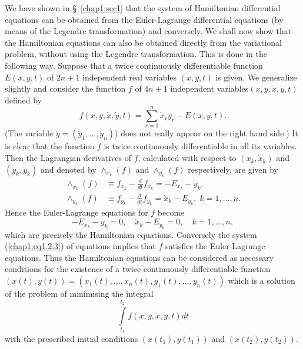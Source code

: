 We have shown in \S\ \ref{chap1:sec1} that the system of Hamiltonian differential equations can be obtained from the Euler-Lagrange differential equations (by means of the Legendre transformation) and conversely. We shall now show that the Hamiltonian equations can also be obtained directly from the variational problem, without using the Legendre transformation. This is done in the following way. Suppose that a twice continuously differentiable function $E(x,y, t)$ of $2n+1$ independent real variables $(x,y,t)$ is given. We generalize slightly and consider the function $f$ of $4n+1$ independent variables\pageoriginale $(x, y, \dot{x}, \dot{y}, t)$ defined by
\begin{equation*} 
f (x, y, \dot{x}, \dot{y}, t) = \sum\limits^n_{r=1} \dot{x}_r y_r - E(x,y,t).
\tag{1.2.1}\label{chap1:eq1.2.1}
\end{equation*}
(The variable $\dot{y} = (\dot{y}_1, \ldots, \dot{y}_n)$) does not really appear on the right hand side.) It is clear that the function $f$ is twice continuously differentiable in all its variables. Then the Lagrangian derivatives of $f$, calculated with respect to $(x_k, \dot{x}_k)$ and $(y_k, \dot{y}_k)$ and denoted by $\wedge_{x_k}(f)$ and $\wedge_{y_k} (f)$ respectively, are given by 
\begin{align*}
\wedge_{x_k} (f) & \equiv f_{x_k} - \frac{d}{dt} f_{\dot{x}_k} = - E_{x_k} - \dot{y}_k, \tag{1.2.2}\label{chap1:eq1.2.2}\\
\wedge_{y_k} (f) & \equiv f_{y_k} - \frac{d}{dt} f_{\dot{y}_k} = \dot{x}_k - E_{y_k}, \; k =1 ,\ldots, n.
\end{align*}
Hence the Euler-Lagrange equations for $f$ become
\begin{equation*}
-E_{x_k} - \dot{y}_k = 0, \quad \dot{x}_k - E_{y_k} = 0, \quad k = 1, \ldots, n,
\tag{1.2.3}\label{chap1:eq1.2.3}
\end{equation*}
which are precisely the Hamiltonian equations. Conversely the system (\ref{chap1:eq1.2.3}) of equations implies that $f$ satisfies the Euler-Lagrange equations. Thus the Hamiltonian equations can be considered as necessary conditions for the existence of a twice continuously differentiable function $(x(t), y(t)) = (x_1 (t), \ldots, x_n(t), y_1(t),\ldots , y_n(t))$ which is a solution of the problem of minimising the integral
$$
\int\limits^{t_2}_{t_1} f(x, y, \dot{x}, \dot{y}, t) dt
$$
with the prescribed initial conditions $(x(t_1), y(t_1))$ and $(x(t_2), y (t_2))$.


